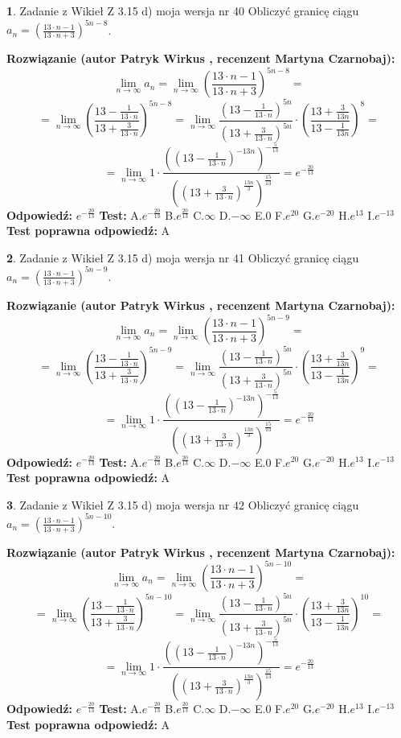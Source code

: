 \documentclass[12pt, a4paper]{article}
\theoremstyle{definition} %
\newtheorem{zad}{}
\newcommand{\zadStart}[1]{\begin{zad}#1\newline}
\newcommand{\zadStop}{\end{zad}}
\newcommand{\rozwStart}[2]{\noindent \textbf{Rozwiązanie (autor #1 , recenzent #2): }\newline}
\newcommand{\rozwStop}{\newline}
\newcommand{\odpStart}{\noindent \textbf{Odpowiedź:}\newline}
\newcommand{\odpStop}{\newline}
\newcommand{\testStart}{\noindent \textbf{Test:}\newline}
\newcommand{\testStop}{\newline}
\newcommand{\kluczStart}{\noindent \textbf{Test poprawna odpowiedź:}\newline}
\newcommand{\kluczStop}{\newline}
\begin{document}
\zadStart{Zadanie z Wikieł Z 3.15 d) moja wersja nr 40}
Obliczyć granicę ciągu $a_{n}=(\frac{13\cdot n - 1}{13 \cdot n + 3})^{5n-8}$.
\zadStop
\rozwStart{Patryk Wirkus}{Martyna Czarnobaj}
$$\lim\limits_{n\to\infty} a_{n} = \lim\limits_{n\to\infty}(\frac{13\cdot n - 1}{13 \cdot n + 3})^{5n-8}=$$
$$=\lim\limits_{n\to\infty}(\frac{13 - \frac{1}{13\cdot n}}{13 + \frac{3}{13 \cdot n}})^{5n-8}=\lim\limits_{n\to\infty}\frac{(13 - \frac{1}{13\cdot n})^{5n}}{(13 + \frac{3}{13\cdot n})^{5n}} \cdot (\frac{13+\frac{3}{13n}}{13-\frac{1}{13n}})^{8}=$$
$$=\lim\limits_{n\to\infty} 1 \cdot \frac{((13-\frac{1}{13 \cdot n})^{-13n})^{-\frac{5}{13}}}{((13+\frac{3}{13 \cdot n})^{\frac{13n}{3}})^{\frac{15}{13}}} =e^{-\frac{20}{13}}$$
\rozwStop
\odpStart
$e^{-\frac{20}{13}}$
\odpStop
\testStart
A.$ e^{-\frac{20}{13}}$
B.$ e^{\frac{20}{13}}$
C.$\infty$
D.$-\infty$
E.$0$
F.$e^{20}$
G.$e^{-20}$
H.$e^{13}$
I.$e^{-13}$
\testStop
\kluczStart
A
\kluczStop



\zadStart{Zadanie z Wikieł Z 3.15 d) moja wersja nr 41}
Obliczyć granicę ciągu $a_{n}=(\frac{13\cdot n - 1}{13 \cdot n + 3})^{5n-9}$.
\zadStop
\rozwStart{Patryk Wirkus}{Martyna Czarnobaj}
$$\lim\limits_{n\to\infty} a_{n} = \lim\limits_{n\to\infty}(\frac{13\cdot n - 1}{13 \cdot n + 3})^{5n-9}=$$
$$=\lim\limits_{n\to\infty}(\frac{13 - \frac{1}{13\cdot n}}{13 + \frac{3}{13 \cdot n}})^{5n-9}=\lim\limits_{n\to\infty}\frac{(13 - \frac{1}{13\cdot n})^{5n}}{(13 + \frac{3}{13\cdot n})^{5n}} \cdot (\frac{13+\frac{3}{13n}}{13-\frac{1}{13n}})^{9}=$$
$$=\lim\limits_{n\to\infty} 1 \cdot \frac{((13-\frac{1}{13 \cdot n})^{-13n})^{-\frac{5}{13}}}{((13+\frac{3}{13 \cdot n})^{\frac{13n}{3}})^{\frac{15}{13}}} =e^{-\frac{20}{13}}$$
\rozwStop
\odpStart
$e^{-\frac{20}{13}}$
\odpStop
\testStart
A.$ e^{-\frac{20}{13}}$
B.$ e^{\frac{20}{13}}$
C.$\infty$
D.$-\infty$
E.$0$
F.$e^{20}$
G.$e^{-20}$
H.$e^{13}$
I.$e^{-13}$
\testStop
\kluczStart
A
\kluczStop



\zadStart{Zadanie z Wikieł Z 3.15 d) moja wersja nr 42}
Obliczyć granicę ciągu $a_{n}=(\frac{13\cdot n - 1}{13 \cdot n + 3})^{5n-10}$.
\zadStop
\rozwStart{Patryk Wirkus}{Martyna Czarnobaj}
$$\lim\limits_{n\to\infty} a_{n} = \lim\limits_{n\to\infty}(\frac{13\cdot n - 1}{13 \cdot n + 3})^{5n-10}=$$
$$=\lim\limits_{n\to\infty}(\frac{13 - \frac{1}{13\cdot n}}{13 + \frac{3}{13 \cdot n}})^{5n-10}=\lim\limits_{n\to\infty}\frac{(13 - \frac{1}{13\cdot n})^{5n}}{(13 + \frac{3}{13\cdot n})^{5n}} \cdot (\frac{13+\frac{3}{13n}}{13-\frac{1}{13n}})^{10}=$$
$$=\lim\limits_{n\to\infty} 1 \cdot \frac{((13-\frac{1}{13 \cdot n})^{-13n})^{-\frac{5}{13}}}{((13+\frac{3}{13 \cdot n})^{\frac{13n}{3}})^{\frac{15}{13}}} =e^{-\frac{20}{13}}$$
\rozwStop
\odpStart
$e^{-\frac{20}{13}}$
\odpStop
\testStart
A.$ e^{-\frac{20}{13}}$
B.$ e^{\frac{20}{13}}$
C.$\infty$
D.$-\infty$
E.$0$
F.$e^{20}$
G.$e^{-20}$
H.$e^{13}$
I.$e^{-13}$
\testStop
\kluczStart
A
\kluczStop
\end{document}
